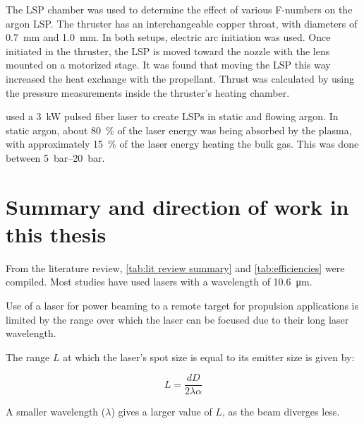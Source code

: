         The LSP chamber was used to determine the effect of various F-numbers on the argon LSP. The thruster has an interchangeable copper throat, with diameters of \qty{0.7}{mm} and \qty{1.0}{mm}. In both setups, electric arc initiation was used. Once initiated in the thruster, the LSP is moved toward the nozzle with the lens mounted on a motorized stage. It was found that moving the LSP this way increased the heat exchange with the propellant. Thrust was calculated by using the pressure measurements inside the thruster's heating chamber.


        \textcite{duplayArgonLaserPlasmaThruster2024a} used a \qty{3}{kW} pulsed fiber laser to create LSPs in static and flowing argon. In static argon, about \qty{80}{\%} of the laser energy was being absorbed by the plasma, with approximately \qty{15}{\%} of the laser energy heating the bulk gas. This was done between \qtyrange{5}{20}{bar}.

    \section{Summary and direction of work in this thesis}
        
        From the literature review, \autoref{tab:lit review summary} and \autoref{tab:efficiencies} were compiled. Most studies have used  lasers with a wavelength of \qty{10.6}{μm}. 
        

        Use of a  laser for power beaming to a remote target for propulsion applications is limited by the range over which the laser can be focused due to their long laser wavelength.

        The range $L$ at which the laser's spot size is equal to its emitter size is given by:
    
        \[
            L = \frac{dD}{2\lambda\alpha}
        \]
        
        \textcite{lubinRoadmapInterstellarFlight2016}

        A smaller wavelength ($\lambda$) gives a larger value of $L$, as the beam diverges less.
        
